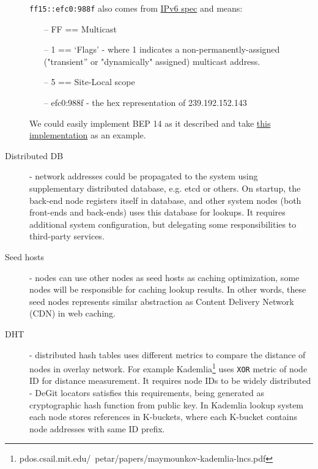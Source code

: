 \documentclass[acmlarge, screen, nonacm]{acmart}
\newcommand{\code}[1]{\texttt{#1}}
\begin{document}
\begin{description}
    \code{ff15::efc0:988f} also comes from \href{http://tools.ietf.org/html/rfc4291#section-2.7}{IPv6 spec} and means:
    \begin{itemize}
      \item[--] FF == Multicast
      \item[--] 1 == ‘Flags' - where 1 indicates a non-permanently-assigned ("transient” or "dynamically" assigned) multicast address.
      \item[--] 5 == Site-Local scope
      \item[--] efc0:988f - the hex representation of 239.192.152.143
    \end{itemize}
    We could easily implement BEP 14 as it described and take \href{https://github.com/transmission/transmission/blob/7f147c65fb07a6baed3d079703ff0a31d1b1ca4c/libtransmission/tr-lpd.c}{this implementation} as an example.
  \item[Distributed DB] - network addresses could be propagated to the system using supplementary distributed
    database, e.g. etcd or others. On startup, the back-end node registers itself in database,
    and other system nodes (both front-ends and back-ends) uses this database for lookups. 
    It requires additional system configuration, but delegating some responsibilities to third-party services.
  \item[Seed hosts] - nodes can use other nodes as seed hosts as caching optimization, some nodes
    will be responsible for caching lookup results. In other words, these seed nodes represents similar abstraction
    as Content Delivery Network (CDN) in web caching.
  \item[DHT] - distributed hash tables uses different metrics to compare the distance of nodes in overlay network.
    For example Kademlia\footnote{pdos.csail.mit.edu/~petar/papers/maymounkov-kademlia-lncs.pdf} uses
    \code{XOR} metric of node ID for distance measurement. It requires node IDs to be widely distributed -
    DeGit locators satisfies this requirements, being generated as cryptographic hash function from
    public key. In Kademlia lookup system each node stores references in K-buckets, where each K-bucket
    contains node addresses with same ID prefix.
\end{description}
\end{document}
